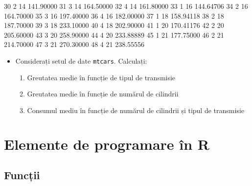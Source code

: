 \documentclass[]{article}
\newenvironment{Shaded}{\begin{snugshade}}{\end{snugshade}}
\newcommand{\DecValTok}[1]{\textcolor[rgb]{0.00,0.00,0.81}{#1}}
\newcommand{\FloatTok}[1]{\textcolor[rgb]{0.00,0.00,0.81}{#1}}
\newenvironment{frshaded*}{%
  \def\FrameCommand{\fboxrule=\FrameRule\fboxsep=\FrameSep \fcolorbox{framecolor}{shadecolor1}}%
  \MakeFramed {\advance\hsize-\width \FrameRestore}}%
{\endMakeFramed}
\newenvironment{rmdblock}[1]
  {\begin{frshaded*}
  \begin{itemize}
  \renewcommand{\labelitemi}{
    \raisebox{-.7\height}[0pt][0pt]{
      {\setkeys{Gin}{width=2em,keepaspectratio}\texttt{[image: images/icons/\#1]}}
    }
  }
  \item
  }
  {
  \end{itemize}
  \end{frshaded*}
  }
\newenvironment{rmdexercise}
  {\begin{rmdblock}{exercise}}
  {\end{rmdblock}}
\begin{document}
\begin{Shaded}
\begin{Highlighting}[]
\DecValTok{30}    \DecValTok{2}   \DecValTok{14} \FloatTok{141.90000}
\DecValTok{31}    \DecValTok{3}   \DecValTok{14} \FloatTok{164.50000}
\DecValTok{32}    \DecValTok{4}   \DecValTok{14} \FloatTok{161.80000}
\DecValTok{33}    \DecValTok{1}   \DecValTok{16} \FloatTok{144.64706}
\DecValTok{34}    \DecValTok{2}   \DecValTok{16} \FloatTok{164.70000}
\DecValTok{35}    \DecValTok{3}   \DecValTok{16} \FloatTok{197.40000}
\DecValTok{36}    \DecValTok{4}   \DecValTok{16} \FloatTok{182.00000}
\DecValTok{37}    \DecValTok{1}   \DecValTok{18} \FloatTok{158.94118}
\DecValTok{38}    \DecValTok{2}   \DecValTok{18} \FloatTok{187.70000}
\DecValTok{39}    \DecValTok{3}   \DecValTok{18} \FloatTok{233.10000}
\DecValTok{40}    \DecValTok{4}   \DecValTok{18} \FloatTok{202.90000}
\DecValTok{41}    \DecValTok{1}   \DecValTok{20} \FloatTok{170.41176}
\DecValTok{42}    \DecValTok{2}   \DecValTok{20} \FloatTok{205.60000}
\DecValTok{43}    \DecValTok{3}   \DecValTok{20} \FloatTok{258.90000}
\DecValTok{44}    \DecValTok{4}   \DecValTok{20} \FloatTok{233.88889}
\DecValTok{45}    \DecValTok{1}   \DecValTok{21} \FloatTok{177.75000}
\DecValTok{46}    \DecValTok{2}   \DecValTok{21} \FloatTok{214.70000}
\DecValTok{47}    \DecValTok{3}   \DecValTok{21} \FloatTok{270.30000}
\DecValTok{48}    \DecValTok{4}   \DecValTok{21} \FloatTok{238.55556}
\end{Highlighting}
\end{Shaded}

\begin{rmdexercise}
Considerați setul de date \texttt{mtcars}. Calculați:

\begin{enumerate}
\def\labelenumi{\alph{enumi})}
\item
  Greutatea medie în funcție de tipul de transmisie
\item
  Greutatea medie în funcție de numărul de cilindrii
\item
  Consumul mediu în funcție de numărul de cilindrii și tipul de
  transmisie
\end{enumerate}
\end{rmdexercise}

\section{Elemente de programare în R}\label{elemente-de-programare-in-r}

\subsection{Funcții}\label{functii}
\end{document}
